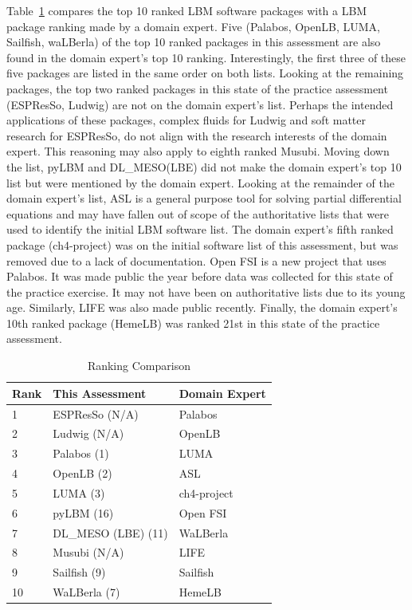 \documentclass[final, 3p, times, authoryear]{elsarticle}
\begin{document}
Table~\ref{rankingcomparison} compares the top 10 ranked LBM software packages
with a LBM package ranking made by a domain expert. Five (Palabos, OpenLB, LUMA,
Sailfish, waLBerla) of the top 10 ranked packages in this assessment are also
found in the domain expert's top 10 ranking. Interestingly, the first three of
these five packages are listed in the same order on both lists. Looking at the
remaining packages, the top two ranked packages in this state of the practice
assessment (ESPResSo, Ludwig) are not on the domain expert's list. Perhaps the
intended applications of these packages, complex fluids for Ludwig and soft
matter research for ESPResSo, do not align with the research interests of the
domain expert. This reasoning may also apply to eighth ranked Musubi. Moving
down the list, pyLBM and DL\_MESO(LBE) did not make the domain expert's top 10
list but were mentioned by the domain expert. Looking at the remainder of the
domain expert's list, ASL is a general purpose tool for solving partial
differential equations and may have fallen out of scope of the authoritative
lists that were used to identify the initial LBM software list. The domain
expert's fifth ranked package (ch4-project) was on the initial software list of
this assessment, but was removed due to a lack of documentation. Open FSI is a
new project that uses Palabos. It was made public the year before data was
collected for this state of the practice exercise. It may not have been on
authoritative lists due to its young age. Similarly, LIFE was also made public
recently. Finally, the domain expert's 10th ranked package (HemeLB) was ranked
21st in this state of the practice assessment. 

\begin{table}
\begin{center}
	\begin{tabular}{ p{2cm}p{4.5cm}p{3.5cm}}
		\toprule
		Rank & This Assessment & Domain Expert\\
		\midrule
		1 & ESPResSo (N/A) & Palabos\\
		2 & Ludwig (N/A) & OpenLB\\
		3 & Palabos (1) & LUMA\\
		4 & OpenLB (2) & ASL\\
		5 & LUMA (3) & ch4-project\\
		6 & pyLBM (16) & Open FSI\\
		7 & DL\_MESO (LBE) (11) & WaLBerla\\
		8 & Musubi (N/A) & LIFE\\
		9 & Sailfish (9) & Sailfish\\
		10 & WaLBerla (7) & HemeLB\\		
		\bottomrule
	\end{tabular}
	\caption{Ranking Comparison} \label{rankingcomparison}
\end{center}
\end{table}
\end{document}
